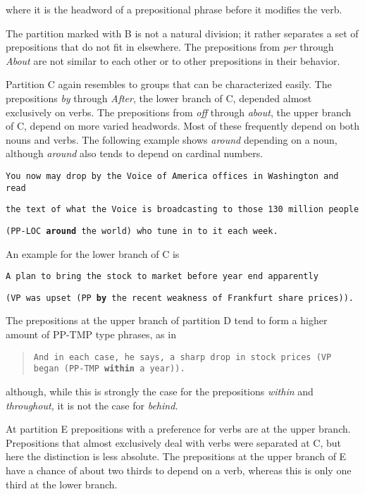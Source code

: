 \noindent
where it is the headword of a prepositional phrase before it modifies
the verb.

The partition marked with B is not a natural division; it rather separates a set
of prepositions that do not fit in elsewhere. The prepositions from {\em per}
through {\em About} are not similar to each other or to other prepositions in their
behavior.

Partition C again resembles to groups that can be characterized easily.  The
prepositions {\em by} through {\em After}, the lower branch of C, depended almost
exclusively on verbs. The prepositions from {\em off} through {\em about}, the upper
branch of C, depend on more varied headwords. Most of these frequently depend on
both nouns and verbs. The following example shows {\em around} depending on a
noun, although {\em around} also tends to depend on cardinal numbers.

\hspace*{4mm}
{\tt You now may drop by the Voice of America offices in Washington and 
read}

\hspace*{4mm}
{\tt the text of what the Voice is broadcasting to those 130 million 
people}

\hspace*{4mm}
{\tt (PP-LOC {\bf around} the world) who tune in to it each week.}

An example for the lower branch of C is

\hspace*{4mm}
{\tt A plan to bring the stock to market before year end apparently} 

\hspace*{4mm}
{\tt (VP was upset (PP {\bf by} the recent weakness of Frankfurt share prices)).}

The prepositions at the upper branch of partition D tend to form a higher
amount of PP-TMP type phrases, as in
\begin{quote}
{\tt And in each case, he says, a sharp drop in stock prices (VP began \newline
(PP-TMP {\bf within} a year)).}
\end{quote}
although, while this is strongly the case for the prepositions {\em within} and
{\em throughout,} it is not the case for {\em behind.}

At partition E prepositions with a preference for verbs are at the
upper branch. Prepositions that almost exclusively deal with verbs
were separated at C, but here the distinction is less absolute. The
prepositions at the upper branch of E have a chance of about two
thirds to depend on a verb, whereas this is only one third at the
lower branch.

